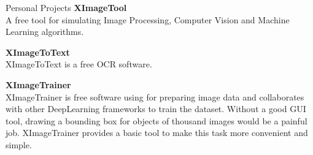 \documentclass{resume}
\begin{document}
	\begin{rSection}{Personal Projects}
		{\bf XImageTool}
		\\ A free tool for simulating Image Processing, Computer Vision and Machine Learning algorithms.

		{\bf XImageToText}
		\\ XImageToText is a free OCR software.

		{\bf XImageTrainer}
		\\XImageTrainer is free software using for preparing image data and collaborates with other DeepLearning frameworks to train the dataset. Without a good GUI tool, drawing a bounding box for objects of thousand images would be a painful job. XImageTrainer provides a basic tool to make this task more convenient and simple.	
	\end{rSection}
\end{document}
